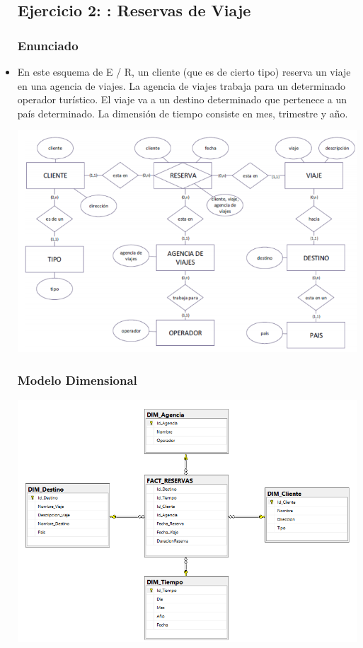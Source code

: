 \begin{itemize}
\subsection{Ejercicio 2: : Reservas de Viaje}

\subsubsection{Enunciado}

		\item En este esquema de E / R, un cliente (que es de cierto tipo) reserva un viaje en una agencia de viajes. La agencia de viajes trabaja para un determinado operador turístico. El viaje va a un destino determinado que pertenece a un país determinado.
La dimensión de tiempo consiste en mes, trimestre y año.

	\begin{center}
	\includegraphics[width=14cm]{./Imagenes/ejercicio2}
	\end{center}

     \subsubsection{Modelo Dimensional }
	\begin{center}
	\includegraphics[width=14cm]{./Imagenes/ejercicio2_dimensional}
	\end{center}

\end{itemize}
